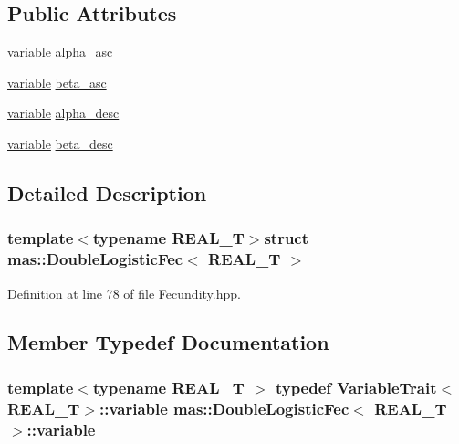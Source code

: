 \subsection*{Public Attributes}
\begin{DoxyCompactItemize}
\item 
\hyperlink{structmas_1_1_double_logistic_fec_abfb3cdee2e273df6dbffdb71bba6ab9c}{variable} \hyperlink{structmas_1_1_double_logistic_fec_a842802b2a752f90e7573f64c39f804b1}{alpha\-\_\-asc}
\item 
\hyperlink{structmas_1_1_double_logistic_fec_abfb3cdee2e273df6dbffdb71bba6ab9c}{variable} \hyperlink{structmas_1_1_double_logistic_fec_a60a24a306e30464e33b1884fc53a1435}{beta\-\_\-asc}
\item 
\hyperlink{structmas_1_1_double_logistic_fec_abfb3cdee2e273df6dbffdb71bba6ab9c}{variable} \hyperlink{structmas_1_1_double_logistic_fec_a62ce4cb22c93f6a2fac67c7ab129749d}{alpha\-\_\-desc}
\item 
\hyperlink{structmas_1_1_double_logistic_fec_abfb3cdee2e273df6dbffdb71bba6ab9c}{variable} \hyperlink{structmas_1_1_double_logistic_fec_a34f906fdd181ef464af015fa8b95432d}{beta\-\_\-desc}
\end{DoxyCompactItemize}


\subsection{Detailed Description}
\subsubsection*{template$<$typename R\-E\-A\-L\-\_\-\-T$>$struct mas\-::\-Double\-Logistic\-Fec$<$ R\-E\-A\-L\-\_\-\-T $>$}



Definition at line 78 of file Fecundity.\-hpp.



\subsection{Member Typedef Documentation}
\hypertarget{structmas_1_1_double_logistic_fec_abfb3cdee2e273df6dbffdb71bba6ab9c}{
\subsubsection[{variable}]{\setlength{\rightskip}{0pt plus 5cm}template$<$typename R\-E\-A\-L\-\_\-\-T $>$ typedef {\bf Variable\-Trait}$<$R\-E\-A\-L\-\_\-\-T$>$\-::{\bf variable} {\bf mas\-::\-Double\-Logistic\-Fec}$<$ R\-E\-A\-L\-\_\-\-T $>$\-::{\bf variable}}}\label{structmas_1_1_double_logistic_fec_abfb3cdee2e273df6dbffdb71bba6ab9c}


